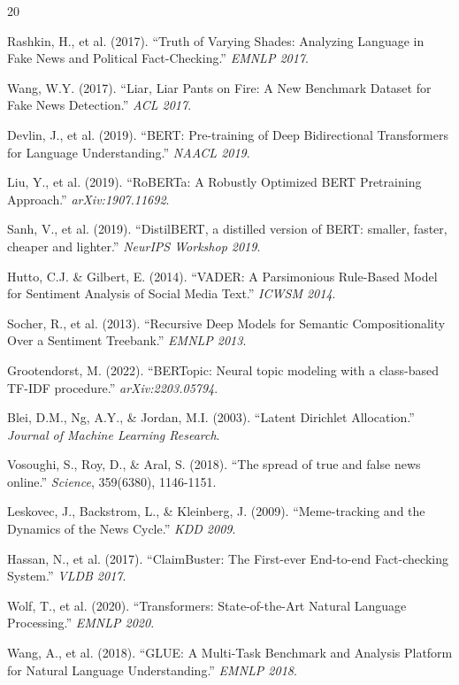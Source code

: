 \documentclass[12pt,a4paper]{article}
\begin{document}
\begin{thebibliography}{20}

 Rashkin, H., et al. (2017). ``Truth of Varying Shades: Analyzing Language in Fake News and Political Fact-Checking.'' \textit{EMNLP 2017}.

 Wang, W.Y. (2017). ``Liar, Liar Pants on Fire: A New Benchmark Dataset for Fake News Detection.'' \textit{ACL 2017}.

 Devlin, J., et al. (2019). ``BERT: Pre-training of Deep Bidirectional Transformers for Language Understanding.'' \textit{NAACL 2019}.

 Liu, Y., et al. (2019). ``RoBERTa: A Robustly Optimized BERT Pretraining Approach.'' \textit{arXiv:1907.11692}.

 Sanh, V., et al. (2019). ``DistilBERT, a distilled version of BERT: smaller, faster, cheaper and lighter.'' \textit{NeurIPS Workshop 2019}.

 Hutto, C.J. \& Gilbert, E. (2014). ``VADER: A Parsimonious Rule-Based Model for Sentiment Analysis of Social Media Text.'' \textit{ICWSM 2014}.

 Socher, R., et al. (2013). ``Recursive Deep Models for Semantic Compositionality Over a Sentiment Treebank.'' \textit{EMNLP 2013}.

 Grootendorst, M. (2022). ``BERTopic: Neural topic modeling with a class-based TF-IDF procedure.'' \textit{arXiv:2203.05794}.

 Blei, D.M., Ng, A.Y., \& Jordan, M.I. (2003). ``Latent Dirichlet Allocation.'' \textit{Journal of Machine Learning Research}.

 Vosoughi, S., Roy, D., \& Aral, S. (2018). ``The spread of true and false news online.'' \textit{Science}, 359(6380), 1146-1151.

 Leskovec, J., Backstrom, L., \& Kleinberg, J. (2009). ``Meme-tracking and the Dynamics of the News Cycle.'' \textit{KDD 2009}.

 Hassan, N., et al. (2017). ``ClaimBuster: The First-ever End-to-end Fact-checking System.'' \textit{VLDB 2017}.

 Wolf, T., et al. (2020). ``Transformers: State-of-the-Art Natural Language Processing.'' \textit{EMNLP 2020}.

 Wang, A., et al. (2018). ``GLUE: A Multi-Task Benchmark and Analysis Platform for Natural Language Understanding.'' \textit{EMNLP 2018}.

\end{thebibliography}
\end{document}
